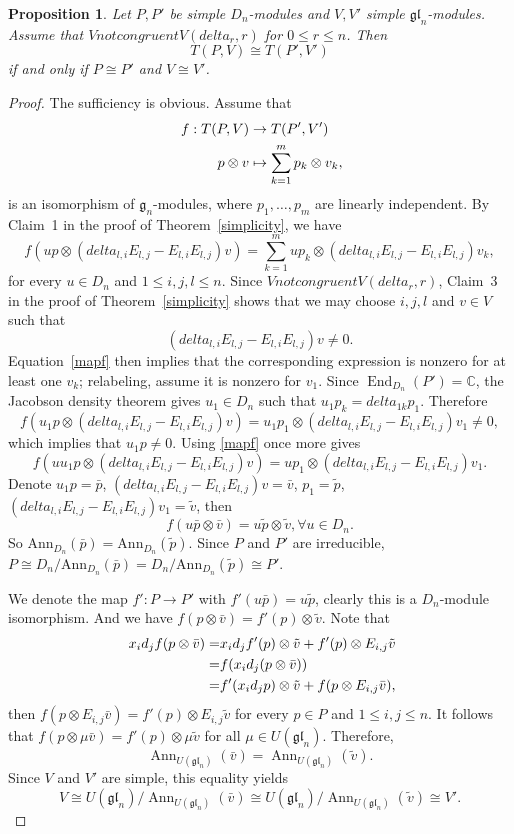 \documentclass[12pt,a4paper]{amsart}
\def\mg{g}%
\def\gl{gl}%
\def\delta{delta}%
\def\ncong{not congruent}%
\newtheorem{proposition}[theorem]{Proposition}%
\numberwithin{equation}{section}
\newcommand{\C}{\mathbb C}
\def\mg{\mathfrak{g}}
\def\gl{\mathfrak{gl}}
\begin{document}
\begin{proposition}
Let \(P,P'\) be simple \(D_n\)-modules and \(V,V'\) simple
\(\gl_n\)-modules. Assume that
\(V\ncong V(\delta_r,r)\) for \(0\leq r\leq n\). Then
\[
T(P,V)\cong T(P',V')
\]
if and only if \(P\cong P'\) and \(V\cong V'\).
\end{proposition}
\begin{proof}
The sufficiency is obvious.
Assume that
$$\aligned \
f: T(P,V) &\rightarrow T(P',V')\\
p\otimes v &\mapsto \sum^m_{k=1}p_k\otimes v_k,
\endaligned$$
is an isomorphism of \(\mg_n\)-modules, where
\(p_1,\ldots,p_m\) are linearly independent. By Claim~1 in the proof
of Theorem~\ref{simplicity}, we have
\begin{equation}\label{mapf}
f(up\otimes (\delta_{l,i}E_{l,j}-E_{l,i}E_{l,j})v)=\sum^m_{k=1}up_k\otimes (\delta_{l,i}E_{l,j}-E_{l,i}E_{l,j})v_k,
\end{equation}
for every \(u\in D_n\) and \(1\leq i,j,l\leq n\).
Since \(V\ncong V(\delta_r,r)\), Claim~3 in the proof of
Theorem~\ref{simplicity} shows that we may choose \(i,j,l\) and
\(v\in V\) such that
\[
(\delta_{l,i}E_{l,j}-E_{l,i}E_{l,j})v\neq0.
\]
Equation~\eqref{mapf} then implies that the corresponding expression
is nonzero for at least one \(v_k\); relabeling, assume it is nonzero
for \(v_1\). Since \(\operatorname{End}_{D_n}(P')=\C\), the Jacobson
density theorem gives \(u_1\in D_n\) such that
\(u_1p_k=\delta_{1k}p_1\). Therefore
$$f(u_1p\otimes (\delta_{l,i}E_{l,j}-E_{l,i}E_{l,j})v)=u_1p_1\otimes (\delta_{l,i}E_{l,j}-E_{l,i}E_{l,j})v_1\neq0,$$
which implies that \(u_1p\neq0\). Using \eqref{mapf} once more gives
$$f(u u_1p\otimes (\delta_{l,i}E_{l,j}-E_{l,i}E_{l,j})v)=up_1\otimes (\delta_{l,i}E_{l,j}-E_{l,i}E_{l,j})v_1.$$
Denote $u_1p=\bar{p}$, $(\delta_{l,i}E_{l,j}-E_{l,i}E_{l,j})v=\bar{v}$, $p_1=\tilde{p}$, $(\delta_{l,i}E_{l,j}-E_{l,i}E_{l,j})v_1=\tilde{v}$, then
$$f(u\bar{p}\otimes \bar{v})=u\tilde{p}\otimes \tilde{v}, \forall u\in D_n.$$
So $\text{Ann}_{D_n}(\bar{p})=\text{Ann}_{D_n}(\tilde{p})$. Since $P$ and $P'$ are irreducible, $P\cong D_n/\text{Ann}_{D_n}(\bar{p})=D_n/\text{Ann}_{D_n}(\tilde{p})\cong P'$.

We denote the map $f':P \rightarrow P'$ with $f'(u\bar{p})=u\tilde{p}$, clearly this is a $D_n$-module isomorphism. And we have $f(p\otimes \bar{v})=f'(p)\otimes \tilde{v}$. Note that
$$\aligned \
x_id_jf(p\otimes \bar{v})=&x_id_jf'(p)\otimes \tilde{v}+ f'(p)\otimes E_{i,j}\tilde{v}\\
=&f(x_id_j(p\otimes \bar{v}))\\
=&f'(x_id_jp)\otimes \tilde{v}+ f(p\otimes E_{i,j}\bar{v}),
\endaligned$$
then \(f(p\otimes E_{i,j}\bar v)=f'(p)\otimes E_{i,j}\tilde v\)
for every \(p\in P\) and \(1\leq i,j\leq n\). It follows that
\(f(p\otimes\mu\bar v)=f'(p)\otimes\mu\tilde v\) for all
\(\mu\in U(\gl_n)\). Therefore,
\[
\operatorname{Ann}_{U(\gl_n)}(\bar v)
=\operatorname{Ann}_{U(\gl_n)}(\tilde v).
\]
Since \(V\) and \(V'\) are simple, this equality yields
\[
V\cong U(\gl_n)/\operatorname{Ann}_{U(\gl_n)}(\bar v)
\cong U(\gl_n)/\operatorname{Ann}_{U(\gl_n)}(\tilde v)
\cong V'.
\]
\end{proof}
\end{document}
